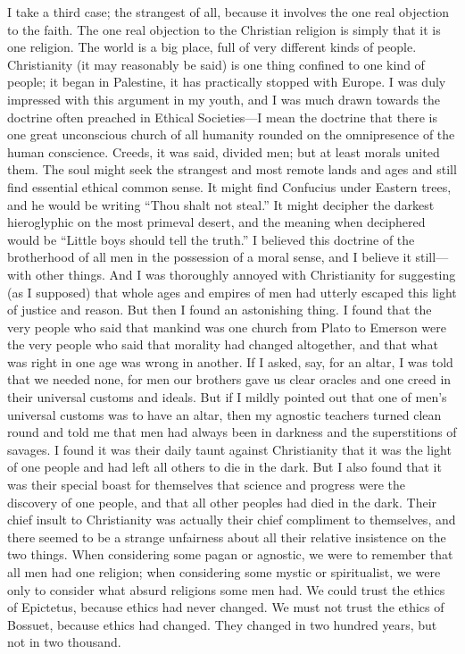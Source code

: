 I take a third case; the strangest of all, because it involves the one real objection to the faith. The one real objection to the Christian religion is simply that it is one religion. The world is a big place, full of very different kinds of people. Christianity (it may reasonably be said) is one thing confined to one kind of people; it began in Palestine, it has practically stopped with Europe. I was duly impressed with this argument in my youth, and I was much drawn towards the doctrine often preached in Ethical Societies—I mean the doctrine that there is one great unconscious church of all humanity rounded on the omnipresence of the human conscience. Creeds, it was said, divided men; but at least morals united them. The soul might seek the strangest and most remote lands and ages and still find essential ethical common sense. It might find Confucius under Eastern trees, and he would be writing “Thou shalt not steal.” It might decipher the darkest hieroglyphic on the most primeval desert, and the meaning when deciphered would be “Little boys should tell the truth.” I believed this doctrine of the brotherhood of all men in the possession of a moral sense, and I believe it still—with other things. And I was thoroughly annoyed with Christianity for suggesting (as I supposed) that whole ages and empires of men had utterly escaped this light of justice and reason. But then I found an astonishing thing. I found that the very people who said that mankind was one church from Plato to Emerson were the very people who said that morality had changed altogether, and that what was right in one age was wrong in another. If I asked, say, for an altar, I was told that we needed none, for men our brothers gave us clear oracles and one creed in their universal customs and ideals. But if I mildly pointed out that one of men’s universal customs was to have an altar, then my agnostic teachers turned clean round and told me that men had always been in darkness and the superstitions of savages. I found it was their daily taunt against Christianity that it was the light of one people and had left all others to die in the dark. But I also found that it was their special boast for themselves that science and progress were the discovery of one people, and that all other peoples had died in the dark. Their chief insult to Christianity was actually their chief compliment to themselves, and there seemed to be a strange unfairness about all their relative insistence on the two things. When considering some pagan or agnostic, we were to remember that all men had one religion; when considering some mystic or spiritualist, we were only to consider what absurd religions some men had. We could trust the ethics of Epictetus, because ethics had never changed. We must not trust the ethics of Bossuet, because ethics had changed. They changed in two hundred years, but not in two thousand.

